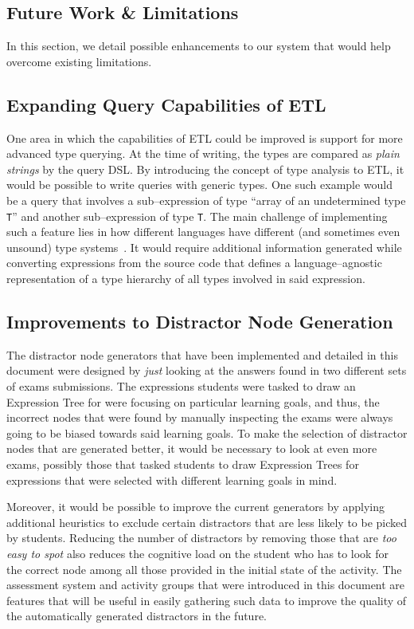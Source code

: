 \begin{chapterBody}
\section{Future Work \& Limitations}

In this section, we detail possible enhancements to our system that would
help overcome existing limitations.

\subsection*{Expanding Query Capabilities of ETL}

One area in which the capabilities of ETL could be improved is support for more
advanced type querying. At the time of writing, the types are compared as
\textit{plain strings} by the query DSL. By introducing the concept of type
analysis to ETL, it would be possible to write queries with generic types.
One such example would be a query that involves a sub–expression of type 
``array of an undetermined type \texttt{T}'' and another sub–expression of
type \texttt{T}. The main challenge of implementing such a feature lies in how
different languages have different (and sometimes even unsound) type
systems~\cite{lu_gradual_2022}.
It would require additional information generated while converting expressions
from the source code that defines a language–agnostic representation of a type
hierarchy of all types involved in said expression.

\subsection*{Improvements to Distractor Node Generation}

The distractor node generators that have been implemented and detailed in this
document were designed by \textit{just} looking at the answers found in two
different sets of exams submissions. The expressions students were tasked to draw
an Expression Tree for were focusing on particular learning goals, and thus, the
incorrect nodes that were found by manually inspecting the exams were always
going to be biased towards said learning goals. To make the selection of
distractor nodes that are generated better, it would be necessary to look at
even more exams, possibly those that tasked students to draw Expression Trees
for expressions that were selected with different learning goals in mind.

Moreover, it would be possible to improve the current generators by applying
additional heuristics to exclude certain distractors that are less likely to be
picked by students. Reducing the number of distractors by removing those that
are \textit{too easy to spot} also reduces the cognitive load on the student who
has to look for the correct node among all those provided in the initial state
of the activity.
The assessment system and activity groups that were introduced in this document
are features that will be useful in easily gathering such data to improve the
quality of the automatically generated distractors in the future.


\end{chapterBody}
